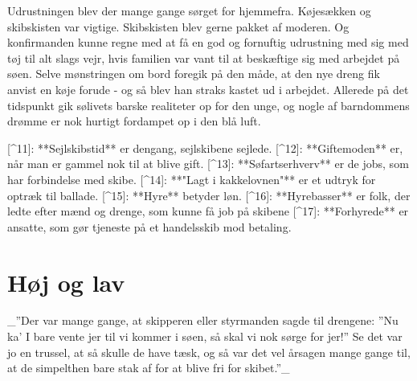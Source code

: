 \documentclass{book}
\begin{document}
Udrustningen blev der mange gange sørget for hjemmefra. Køjesækken og skibskisten var
vigtige. Skibskisten blev gerne pakket af moderen. Og konfirmanden kunne regne med at få
en god og fornuftig udrustning med sig med tøj til alt slags vejr, hvis familien var
vant til at beskæftige sig med arbejdet på søen. Selve mønstringen om bord foregik på
den måde, at den nye dreng fik anvist en køje forude - og så blev han straks kastet ud i
arbejdet. Allerede på det tidspunkt gik sølivets barske realiteter op for den unge, og
nogle af barndommens drømme er nok hurtigt fordampet op i den blå luft.



[^11]: **Sejlskibstid** er dengang, sejlskibene sejlede.
[^12]: **Giftemoden** er, når man er gammel nok til at blive gift.
[^13]: **Søfartserhverv** er de jobs, som har forbindelse med skibe.
[^14]: **"Lagt i kakkelovnen"** er et udtryk for optræk til ballade.
[^15]: **Hyre** betyder løn.
[^16]: **Hyrebasser** er folk, der ledte efter mænd og drenge, som kunne få job
       på skibene
[^17]: **Forhyrede** er ansatte, som gør tjeneste på et handelsskib mod
  betaling.

\chapter{Høj og lav}

 _”Der var mange gange, at skipperen eller styrmanden sagde til drengene: ”Nu ka' I bare
 vente jer til vi kommer i søen, så skal vi nok sørge for jer!” Se det var jo en trussel,
 at så skulle de have tæsk, og så var det vel årsagen mange gange til, at de simpelthen
 bare stak af for at blive fri for skibet.”_

\end{document}
